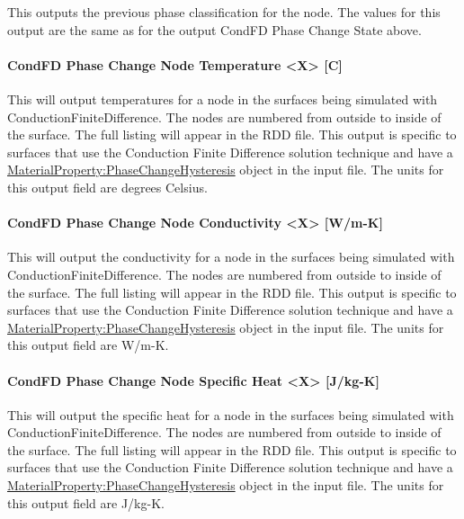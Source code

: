 This outputs the previous phase classification for the node.  The values for this output are the same as for the output CondFD Phase Change State above.

\paragraph{CondFD Phase Change Node Temperature \textless{}X\textgreater{} {[}C{]}}\label{condfd-phase-change-node-temperature-x-c}

This will output temperatures for a node in the surfaces being simulated with ConductionFiniteDifference. The nodes are numbered from outside to inside of the surface.  The full listing will appear in the RDD file.  This output is specific to surfaces that use the Conduction Finite Difference solution technique and have a \hyperref[materialpropertyphasechangehysteresis]{MaterialProperty:PhaseChangeHysteresis} object in the input file.  The units for this output field are degrees Celsius.

\paragraph{CondFD Phase Change Node Conductivity \textless{}X\textgreater{} {[}W/m-K{]}}\label{condfd-phase-change-node-conductivity-x-w-m-k}

This will output the conductivity for a node in the surfaces being simulated with ConductionFiniteDifference.  The nodes are numbered from outside to inside of the surface. The full listing will appear in the RDD file.  This output is specific to surfaces that use the Conduction Finite Difference solution technique and have a \hyperref[materialpropertyphasechangehysteresis]{MaterialProperty:PhaseChangeHysteresis} object in the input file.  The units for this output field are W/m-K.

\paragraph{CondFD Phase Change Node Specific Heat \textless{}X\textgreater{} {[}J/kg-K{]}}\label{condfd-phase-change-node-specific-heat-x-j-kg-k}

This will output the specific heat for a node in the surfaces being simulated with ConductionFiniteDifference.  The nodes are numbered from outside to inside of the surface. The full listing will appear in the RDD file.  This output is specific to surfaces that use the Conduction Finite Difference solution technique and have a \hyperref[materialpropertyphasechangehysteresis]{MaterialProperty:PhaseChangeHysteresis} object in the input file. The units for this output field are J/kg-K.

